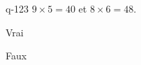 \begin{truefalse}{q-123}
$9\times 5 = 40$ et $8\times 6 = 48$.
\item Vrai
\item* Faux
\end{truefalse}

